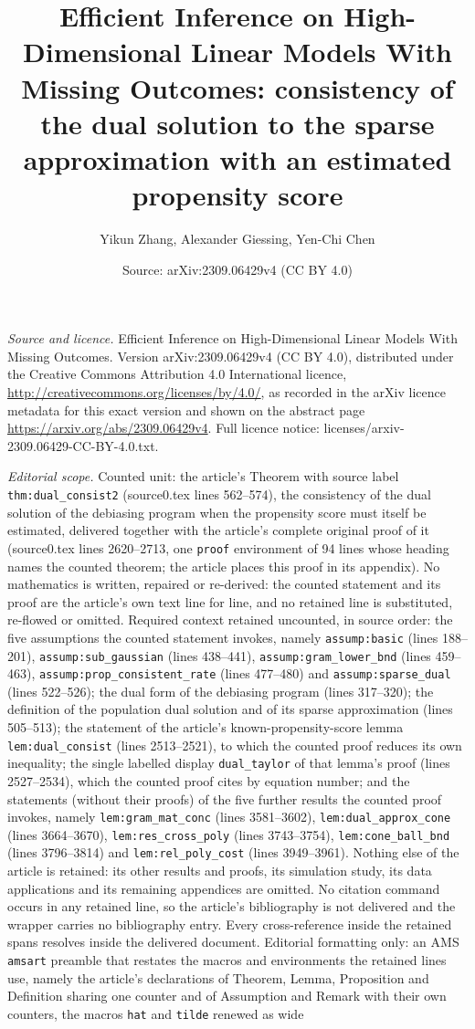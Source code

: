 \documentclass[10pt,a4paper]{amsart}
\title[Consistency of the dual solution]{Efficient Inference on High-Dimensional Linear Models With Missing Outcomes: consistency of the dual solution to the sparse approximation with an estimated propensity score}
\author{Yikun Zhang, Alexander Giessing, Yen-Chi Chen}
\date{Source: arXiv:2309.06429v4 (CC BY 4.0)}
\theoremstyle{plain}
\theoremstyle{remark}
\begin{document}
\maketitle
\noindent\emph{Source and licence.} Efficient Inference on High-Dimensional Linear Models With Missing Outcomes. Version arXiv:2309.06429v4 (CC BY 4.0), distributed under the Creative Commons Attribution 4.0 International licence, \url{http://creativecommons.org/licenses/by/4.0/}, as recorded in the arXiv licence metadata for this exact version and shown on the abstract page \url{https://arxiv.org/abs/2309.06429v4}. Full licence notice: licenses/arxiv-2309.06429-CC-BY-4.0.txt.\par\smallskip

\noindent\textit{Editorial scope.} Counted unit: the article's Theorem with source label \texttt{thm:dual\_consist2} (source0.tex lines 562--574), the consistency of the dual solution of the debiasing program when the propensity score must itself be estimated, delivered together with the article's complete original proof of it (source0.tex lines 2620--2713, one \texttt{proof} environment of 94 lines whose heading names the counted theorem; the article places this proof in its appendix). No mathematics is written, repaired or re-derived: the counted statement and its proof are the article's own text line for line, and no retained line is substituted, re-flowed or omitted. Required context retained uncounted, in source order: the five assumptions the counted statement invokes, namely \texttt{assump:basic} (lines 188--201), \texttt{assump:sub\_gaussian} (lines 438--441), \texttt{assump:gram\_lower\_bnd} (lines 459--463), \texttt{assump:prop\_consistent\_rate} (lines 477--480) and \texttt{assump:sparse\_dual} (lines 522--526); the dual form of the debiasing program (lines 317--320); the definition of the population dual solution and of its sparse approximation (lines 505--513); the statement of the article's known-propensity-score lemma \texttt{lem:dual\_consist} (lines 2513--2521), to which the counted proof reduces its own inequality; the single labelled display \texttt{dual\_taylor} of that lemma's proof (lines 2527--2534), which the counted proof cites by equation number; and the statements (without their proofs) of the five further results the counted proof invokes, namely \texttt{lem:gram\_mat\_conc} (lines 3581--3602), \texttt{lem:dual\_approx\_cone} (lines 3664--3670), \texttt{lem:res\_cross\_poly} (lines 3743--3754), \texttt{lem:cone\_ball\_bnd} (lines 3796--3814) and \texttt{lem:rel\_poly\_cost} (lines 3949--3961). Nothing else of the article is retained: its other results and proofs, its simulation study, its data applications and its remaining appendices are omitted. No citation command occurs in any retained line, so the article's bibliography is not delivered and the wrapper carries no bibliography entry. Every cross-reference inside the retained spans resolves inside the delivered document. Editorial formatting only: an AMS \texttt{amsart} preamble that restates the macros and environments the retained lines use, namely the article's declarations of Theorem, Lemma, Proposition and Definition sharing one counter and of Assumption and Remark with their own counters, the macros \texttt{hat} and \texttt{tilde} renewed as wide 
\end{document}
